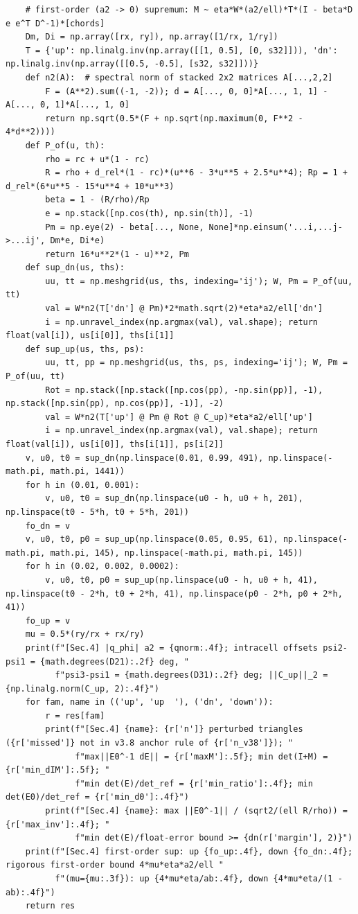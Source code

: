 \documentclass[11pt,a4paper]{article}
\theoremstyle{definition}
\theoremstyle{remark}
\begin{document}
\begin{lstlisting}
    # first-order (a2 -> 0) supremum: M ~ eta*W*(a2/ell)*T*(I - beta*D e e^T D^-1)*[chords]
    Dm, Di = np.array([rx, ry]), np.array([1/rx, 1/ry])
    T = {'up': np.linalg.inv(np.array([[1, 0.5], [0, s32]])), 'dn': np.linalg.inv(np.array([[0.5, -0.5], [s32, s32]]))}
    def n2(A):  # spectral norm of stacked 2x2 matrices A[...,2,2]
        F = (A**2).sum((-1, -2)); d = A[..., 0, 0]*A[..., 1, 1] - A[..., 0, 1]*A[..., 1, 0]
        return np.sqrt(0.5*(F + np.sqrt(np.maximum(0, F**2 - 4*d**2))))
    def P_of(u, th):
        rho = rc + u*(1 - rc)
        R = rho + d_rel*(1 - rc)*(u**6 - 3*u**5 + 2.5*u**4); Rp = 1 + d_rel*(6*u**5 - 15*u**4 + 10*u**3)
        beta = 1 - (R/rho)/Rp
        e = np.stack([np.cos(th), np.sin(th)], -1)
        Pm = np.eye(2) - beta[..., None, None]*np.einsum('...i,...j->...ij', Dm*e, Di*e)
        return 16*u**2*(1 - u)**2, Pm
    def sup_dn(us, ths):
        uu, tt = np.meshgrid(us, ths, indexing='ij'); W, Pm = P_of(uu, tt)
        val = W*n2(T['dn'] @ Pm)*2*math.sqrt(2)*eta*a2/ell['dn']
        i = np.unravel_index(np.argmax(val), val.shape); return float(val[i]), us[i[0]], ths[i[1]]
    def sup_up(us, ths, ps):
        uu, tt, pp = np.meshgrid(us, ths, ps, indexing='ij'); W, Pm = P_of(uu, tt)
        Rot = np.stack([np.stack([np.cos(pp), -np.sin(pp)], -1), np.stack([np.sin(pp), np.cos(pp)], -1)], -2)
        val = W*n2(T['up'] @ Pm @ Rot @ C_up)*eta*a2/ell['up']
        i = np.unravel_index(np.argmax(val), val.shape); return float(val[i]), us[i[0]], ths[i[1]], ps[i[2]]
    v, u0, t0 = sup_dn(np.linspace(0.01, 0.99, 491), np.linspace(-math.pi, math.pi, 1441))
    for h in (0.01, 0.001):
        v, u0, t0 = sup_dn(np.linspace(u0 - h, u0 + h, 201), np.linspace(t0 - 5*h, t0 + 5*h, 201))
    fo_dn = v
    v, u0, t0, p0 = sup_up(np.linspace(0.05, 0.95, 61), np.linspace(-math.pi, math.pi, 145), np.linspace(-math.pi, math.pi, 145))
    for h in (0.02, 0.002, 0.0002):
        v, u0, t0, p0 = sup_up(np.linspace(u0 - h, u0 + h, 41), np.linspace(t0 - 2*h, t0 + 2*h, 41), np.linspace(p0 - 2*h, p0 + 2*h, 41))
    fo_up = v
    mu = 0.5*(ry/rx + rx/ry)
    print(f"[Sec.4] |q_phi| a2 = {qnorm:.4f}; intracell offsets psi2-psi1 = {math.degrees(D21):.2f} deg, "
          f"psi3-psi1 = {math.degrees(D31):.2f} deg; ||C_up||_2 = {np.linalg.norm(C_up, 2):.4f}")
    for fam, name in (('up', 'up  '), ('dn', 'down')):
        r = res[fam]
        print(f"[Sec.4] {name}: {r['n']} perturbed triangles ({r['missed']} not in v3.8 anchor rule of {r['n_v38']}); "
              f"max||E0^-1 dE|| = {r['maxM']:.5f}; min det(I+M) = {r['min_dIM']:.5f}; "
              f"min det(E)/det_ref = {r['min_ratio']:.4f}; min det(E0)/det_ref = {r['min_d0']:.4f}")
        print(f"[Sec.4] {name}: max ||E0^-1|| / (sqrt2/(ell R/rho)) = {r['max_inv']:.4f}; "
              f"min det(E)/float-error bound >= {dn(r['margin'], 2)}")
    print(f"[Sec.4] first-order sup: up {fo_up:.4f}, down {fo_dn:.4f}; rigorous first-order bound 4*mu*eta*a2/ell "
          f"(mu={mu:.3f}): up {4*mu*eta/ab:.4f}, down {4*mu*eta/(1 - ab):.4f}")
    return res



\end{lstlisting}
\end{document}
